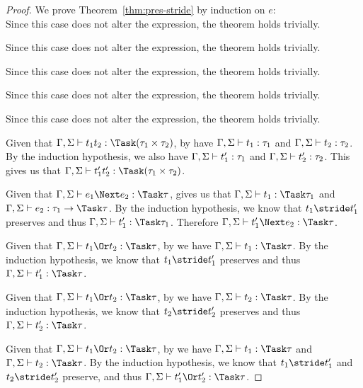 \begin{proof}
  We prove Theorem~\ref{thm:pres-stride} by induction on $e$:\\

     {Since this case does not alter the expression, the theorem holds trivially.}

     {Since this case does not alter the expression, the theorem holds trivially.}

     {Since this case does not alter the expression, the theorem holds trivially.}

     {Since this case does not alter the expression, the theorem holds trivially.}

     {Since this case does not alter the expression, the theorem holds trivially.}

     {Given that $\Gamma,\Sigma\infers t_1\And t_2:\Task(\tau_1\times\tau_2)$, by  have $\Gamma,\Sigma\vdash t_1:\tau_1$ and $\Gamma,\Sigma\vdash t_2:\tau_2$.
     By the induction hypothesis, we also have $\Gamma,\Sigma\vdash t_1':\tau_1$ and $\Gamma,\Sigma\vdash t_2':\tau_2$.
     This gives us that $\Gamma,\Sigma\infers t_1'\And t_2':\Task(\tau_1\times\tau_2)$.}

       {Given that
  $\Gamma,\Sigma\infers e_1\Next e_2:\Task \tau$,  gives us that $\Gamma,\Sigma\infers t_1:\Task\tau_1$ and
  $\Gamma,\Sigma\infers e_2:\tau_1 \to \Task \tau$. By the induction hypothesis,
  we know that $t_1\stride t_1'$ preserves and thus
  $\Gamma,\Sigma\infers t_1':\Task\tau_1$. Therefore
  $\Gamma,\Sigma\infers t_1'\Next e_2:\Task\tau$.}

       {Given that
  $\Gamma,\Sigma\infers t_1\Or t_2:\Task\tau$, by  we have
  $\Gamma,\Sigma\infers t_1:\Task\tau$. By the induction hypothesis, we know that
  $t_1\stride t_1'$ preserves and thus $\Gamma,\Sigma\infers t_1':\Task\tau$.}

     {Given that $\Gamma,\Sigma\infers t_1\Or t_2:\Task\tau$, by  we have $\Gamma,\Sigma\infers t_2:\Task\tau$.
     By the induction hypothesis, we know that $t_2\stride t_2'$ preserves and thus $\Gamma,\Sigma\infers t_2':\Task\tau$.}

  {Given that $\Gamma,\Sigma\infers t_1\Or t_2:\Task\tau$, by  we have $\Gamma,\Sigma\infers t_1:\Task\tau$ and $\Gamma,\Sigma\infers t_2:\Task\tau$.
  By the induction hypothesis, we know that $t_1\stride t_1'$ and $t_2\stride t_2'$ preserve, and thus $\Gamma,\Sigma\infers t_1'\Or t_2':\Task\tau$.}


\end{proof}
